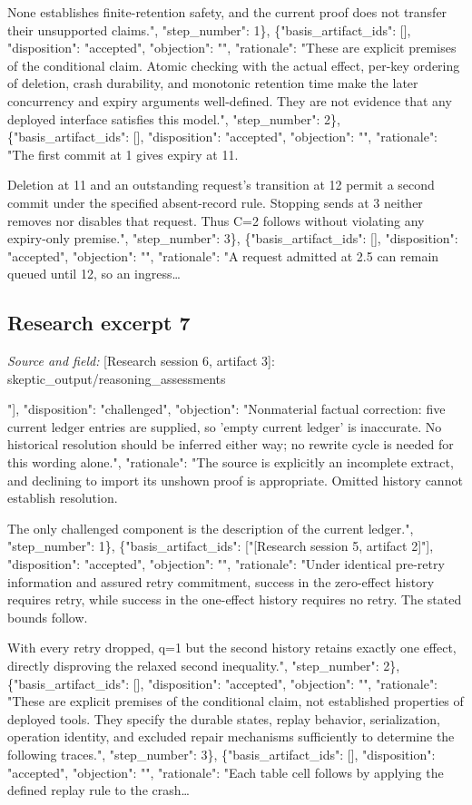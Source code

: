 \documentclass[11pt]{article}
\begin{document}
None establishes finite-retention safety, and the current proof does not transfer their unsupported claims.", "step\_number": 1\}, \{"basis\_artifact\_ids": [], "disposition": "accepted", "objection": "", "rationale": "These are explicit premises of the conditional claim. Atomic checking with the actual effect, per-key ordering of deletion, crash durability, and monotonic retention time make the later concurrency and expiry arguments well-defined. They are not evidence that any deployed interface satisfies this model.", "step\_number": 2\}, \{"basis\_artifact\_ids": [], "disposition": "accepted", "objection": "", "rationale": "The first commit at 1 gives expiry at 11.

Deletion at 11 and an outstanding request's transition at 12 permit a second commit under the specified absent-record rule. Stopping sends at 3 neither removes nor disables that request. Thus C=2 follows without violating any expiry-only premise.", "step\_number": 3\}, \{"basis\_artifact\_ids": [], "disposition": "accepted", "objection": "", "rationale": "A request admitted at 2.5 can remain queued until 12, so an ingress\ldots{}

\subsection{Research excerpt 7}
\textit{Source and field: }[Research session 6, artifact 3]: skeptic\_output/reasoning\_assessments\par
[\{"basis\_artifact\_ids": ["[Research session 5, artifact 2]"], "disposition": "challenged", "objection": "Nonmaterial factual correction: five current ledger entries are supplied, so 'empty current ledger' is inaccurate. No historical resolution should be inferred either way; no rewrite cycle is needed for this wording alone.", "rationale": "The source is explicitly an incomplete extract, and declining to import its unshown proof is appropriate. Omitted history cannot establish resolution.

The only challenged component is the description of the current ledger.", "step\_number": 1\}, \{"basis\_artifact\_ids": ["[Research session 5, artifact 2]"], "disposition": "accepted", "objection": "", "rationale": "Under identical pre-retry information and assured retry commitment, success in the zero-effect history requires retry, while success in the one-effect history requires no retry. The stated bounds follow.

With every retry dropped, q=1 but the second history retains exactly one effect, directly disproving the relaxed second inequality.", "step\_number": 2\}, \{"basis\_artifact\_ids": [], "disposition": "accepted", "objection": "", "rationale": "These are explicit premises of the conditional claim, not established properties of deployed tools. They specify the durable states, replay behavior, serialization, operation identity, and excluded repair mechanisms sufficiently to determine the following traces.", "step\_number": 3\}, \{"basis\_artifact\_ids": [], "disposition": "accepted", "objection": "", "rationale": "Each table cell follows by applying the defined replay rule to the crash\ldots{}
\end{document}
